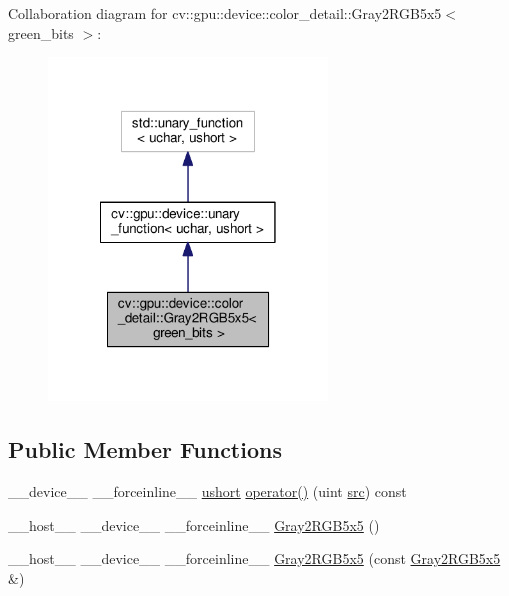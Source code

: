 Collaboration diagram for cv\-:\-:gpu\-:\-:device\-:\-:color\-\_\-detail\-:\-:Gray2\-R\-G\-B5x5$<$ green\-\_\-bits $>$\-:\nopagebreak
\begin{figure}[H]
\begin{center}
\leavevmode
\includegraphics[width=210pt]{structcv_1_1gpu_1_1device_1_1color__detail_1_1Gray2RGB5x5__coll__graph}
\end{center}
\end{figure}
\subsection*{Public Member Functions}
\begin{DoxyCompactItemize}
\item 
\-\_\-\-\_\-device\-\_\-\-\_\- \-\_\-\-\_\-forceinline\-\_\-\-\_\- \hyperlink{core_2types__c_8h_ab95f123a6c9bcfee6a343170ef8c5f69}{ushort} \hyperlink{structcv_1_1gpu_1_1device_1_1color__detail_1_1Gray2RGB5x5_aa6da0bfe8d0d28bf4967493923cb4aee}{operator()} (uint \hyperlink{legacy_8hpp_a371cd109b74033bc4366f584edd3dacc}{src}) const 
\item 
\-\_\-\-\_\-host\-\_\-\-\_\- \-\_\-\-\_\-device\-\_\-\-\_\- \-\_\-\-\_\-forceinline\-\_\-\-\_\- \hyperlink{structcv_1_1gpu_1_1device_1_1color__detail_1_1Gray2RGB5x5_a2a597a43a6a7447c42278fe676944fda}{Gray2\-R\-G\-B5x5} ()
\item 
\-\_\-\-\_\-host\-\_\-\-\_\- \-\_\-\-\_\-device\-\_\-\-\_\- \-\_\-\-\_\-forceinline\-\_\-\-\_\- \hyperlink{structcv_1_1gpu_1_1device_1_1color__detail_1_1Gray2RGB5x5_a46fd7fa594c25685159bfe0c93fbc2c5}{Gray2\-R\-G\-B5x5} (const \hyperlink{structcv_1_1gpu_1_1device_1_1color__detail_1_1Gray2RGB5x5}{Gray2\-R\-G\-B5x5} \&)
\end{DoxyCompactItemize}


